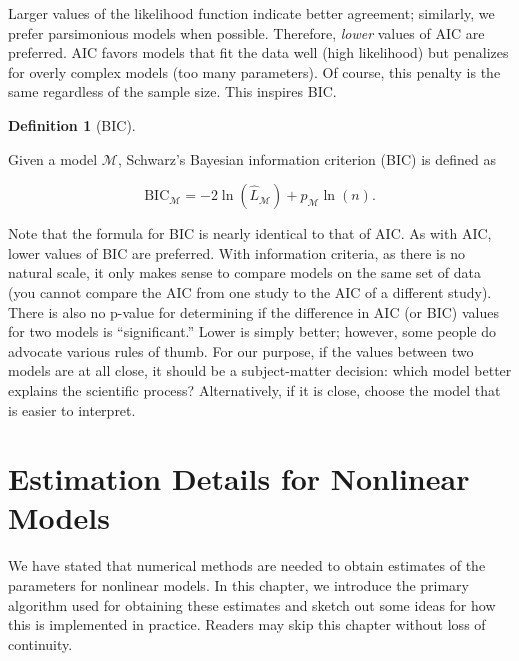 \documentclass[
  letterpaper,
  DIV=11,
  numbers=noendperiod]{scrreprt}
\theoremstyle{definition}
\newtheorem{definition}{Definition}[chapter]
\theoremstyle{definition}
\theoremstyle{remark}
\begin{document}
Larger values of the likelihood function indicate better agreement;
similarly, we prefer parsimonious models when possible. Therefore,
\emph{lower} values of AIC are preferred. AIC favors models that fit the
data well (high likelihood) but penalizes for overly complex models (too
many parameters). Of course, this penalty is the same regardless of the
sample size. This inspires BIC.

\begin{definition}[BIC]\protect\hypertarget{def-bic}{}\label{def-bic}

Given a model \(\mathcal{M}\), Schwarz's Bayesian information criterion
(BIC) is defined as

\[\text{BIC}_{\mathcal{M}} = -2\ln\left(\widehat{L}_{\mathcal{M}}\right) + p_{\mathcal{M}} \ln(n).\]

\end{definition}

Note that the formula for BIC is nearly identical to that of AIC. As
with AIC, lower values of BIC are preferred. With information criteria,
as there is no natural scale, it only makes sense to compare models on
the same set of data (you cannot compare the AIC from one study to the
AIC of a different study). There is also no p-value for determining if
the difference in AIC (or BIC) values for two models is ``significant.''
Lower is simply better; however, some people do advocate various rules
of thumb. For our purpose, if the values between two models are at all
close, it should be a subject-matter decision: which model better
explains the scientific process? Alternatively, if it is close, choose
the model that is easier to interpret.

\hypertarget{sec-nlm-estimation}{%
\chapter{Estimation Details for Nonlinear
Models}\label{sec-nlm-estimation}}

\providecommand{\norm}[1]{\left\lVert#1\right\rVert}
\providecommand{\abs}[1]{\left\lvert#1\right\rvert}
\providecommand{\dist}[1]{\stackrel{\text{#1}}{\sim}}
\providecommand{\ind}[1]{\mathbb{I}\left(#1\right)}
\providecommand{\bm}[1]{\mathbf{#1}}
\providecommand{\bs}[1]{\boldsymbol{#1}}
\providecommand{\Ell}{\mathcal{L}}
\providecommand{\indep}{\perp\negthickspace\negmedspace\perp}

We have stated that numerical methods are needed to obtain estimates of
the parameters for nonlinear models. In this chapter, we introduce the
primary algorithm used for obtaining these estimates and sketch out some
ideas for how this is implemented in practice. Readers may skip this
chapter without loss of continuity.
\end{document}
